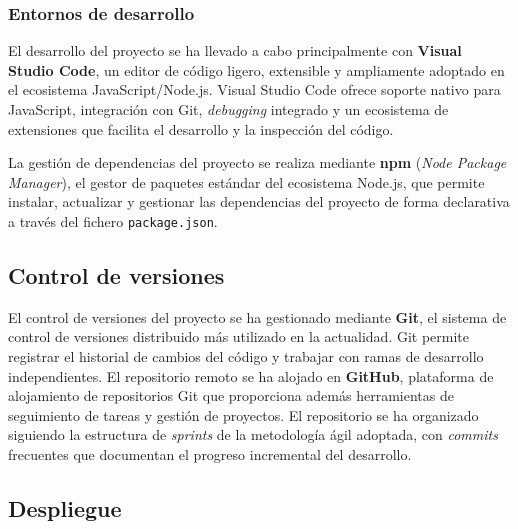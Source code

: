 \subsubsection{Entornos de desarrollo}

El desarrollo del proyecto se ha llevado a cabo principalmente con \textbf{Visual Studio Code}, un editor de código ligero, extensible y ampliamente adoptado en el ecosistema JavaScript/Node.js. Visual Studio Code ofrece soporte nativo para JavaScript, integración con Git, \textit{debugging} integrado y un ecosistema de extensiones que facilita el desarrollo y la inspección del código.

La gestión de dependencias del proyecto se realiza mediante \textbf{npm} (\textit{Node Package Manager}), el gestor de paquetes estándar del ecosistema Node.js, que permite instalar, actualizar y gestionar las dependencias del proyecto de forma declarativa a través del fichero \texttt{package.json}.

\subsection{Control de versiones}

El control de versiones del proyecto se ha gestionado mediante \textbf{Git}, el sistema de control de versiones distribuido más utilizado en la actualidad. Git permite registrar el historial de cambios del código y trabajar con ramas de desarrollo independientes. El repositorio remoto se ha alojado en \textbf{GitHub}, plataforma de alojamiento de repositorios Git que proporciona además herramientas de seguimiento de tareas y gestión de proyectos. El repositorio se ha organizado siguiendo la estructura de \textit{sprints} de la metodología ágil adoptada, con \textit{commits} frecuentes que documentan el progreso incremental del desarrollo.

\begin{center}
\hspace{1.0cm}%
%
\end{center}

\subsection{Despliegue}

